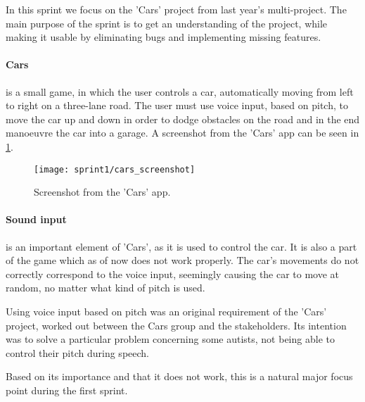In this sprint we focus on the 'Cars' project from last year's multi-project.
The main purpose of the sprint is to get an understanding of the project, while making it usable by eliminating bugs and implementing missing features.

\paragraph{Cars} is a small game, in which the user controls a car, automatically moving from left to right on a three-lane road.
The user must use voice input, based on pitch, to move the car up and down in order to dodge obstacles on the road and in the end manoeuvre the car into a garage.
A screenshot from the 'Cars' app can be seen in \cref{fig:cars_screenshot}.

\begin{figure}[h]
\centering
\texttt{[image: sprint1/cars\_screenshot]}
\caption{Screenshot from the 'Cars' app.}
\label{fig:cars_screenshot}
\end{figure}

\paragraph{Sound input} is an important element of 'Cars', as it is used to control the car.
It is also a part of the game which as of now does not work properly.
The car's movements do not correctly correspond to the voice input, seemingly causing the car to move at random, no matter what kind of pitch is used.

Using voice input based on pitch was an original requirement of the 'Cars' project, worked out between the Cars group and the stakeholders.
Its intention was to solve a particular problem concerning some autists, not being able to control their pitch during speech.

Based on its importance and that it does not work, this is a natural major focus point during the first sprint.